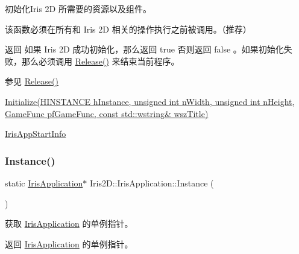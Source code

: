 初始化\+Iris 2D 所需要的资源以及组件。 

该函数必须在所有和 Iris 2D 相关的操作执行之前被调用。（推荐） \begin{DoxyReturn}{返回}
如果 Iris 2D 成功初始化，那么返回 true 否则返回 false 。如果初始化失败，那么必须调用 \hyperlink{class_iris2_d_1_1_iris_application_a486d999a8d9e96f21b9d064d10d15b96}{Release()} 来结束当前程序。 
\end{DoxyReturn}
\begin{DoxySeeAlso}{参见}
\hyperlink{class_iris2_d_1_1_iris_application_a486d999a8d9e96f21b9d064d10d15b96}{Release()} 

\hyperlink{class_iris2_d_1_1_iris_application_a84f3ddebb3a3ffb0c172bd41fb952e1a}{Initialize(\+H\+I\+N\+S\+T\+A\+N\+C\+E h\+Instance, unsigned int n\+Width, unsigned int n\+Height, Game\+Func pf\+Game\+Func, const std\+::wstring\& wsz\+Title)} 

\hyperlink{struct_iris2_d_1_1_iris_application_1_1_iris_app_start_info}{Iris\+App\+Start\+Info} 
\end{DoxySeeAlso}
\mbox{\label{class_iris2_d_1_1_iris_application_ab2a9826c10d90732f398859782817f8e}} 
\subsubsection{\texorpdfstring{Instance()}{Instance()}}
{\footnotesize\ttfamily static \hyperlink{class_iris2_d_1_1_iris_application}{Iris\+Application}$\ast$ Iris2\+D\+::\+Iris\+Application\+::\+Instance (\begin{DoxyParamCaption}{ }\end{DoxyParamCaption})\hspace{0.3cm}{\ttfamily [static]}}



获取 \hyperlink{class_iris2_d_1_1_iris_application}{Iris\+Application} 的单例指针。 

\begin{DoxyReturn}{返回}
\hyperlink{class_iris2_d_1_1_iris_application}{Iris\+Application} 的单例指针。 
\end{DoxyReturn}
\mbox{\label{class_iris2_d_1_1_iris_application_ab7a5b7f956f23d3fb3d2ee0de573cb53}} 
